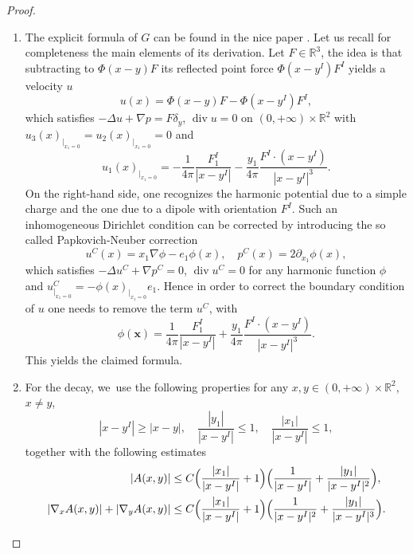 \documentclass[JEP,XML,SOM,Unicode,NoEqCountersInSection,published]{cedram}
\renewcommand{\div}{\operatorname{div}}
\theoremstyle{plain}
\theoremstyle{definition}
\newcommand{\R}{\mathbb{R}}
\begin{document}
\skpt
\begin{proof}
\begin{enumerate}
\item The explicit formula of $G$ can be found in the nice paper \cite[Formula (21)]{Gimbutas_Greengard_Veerapaneni_2015}. Let us recall for completeness the main elements of its derivation. Let $F\in \R^3$, the idea is that subtracting to $\Phi(x-y)F$ its reflected point force $\Phi(x-y^I)F^I$ yields a velocity $u$
\[
u(x)=\Phi(x-y)F-\Phi(x-y^I)F^I,
\]
which satisfies $-\Delta u +\nabla p=F \delta_y$, $\div u=0$ on $(0,+\infty)\times\R^2$ with $u_3(x)_{|_{x_1=0}}=u_2(x)_{|_{x_1=0}}=0$ and
\[
u_1(x)_{|_{x_1=0}}=- \frac{1}{4\pi}\frac{F_1^I}{|x-y^I|}-\frac{y_1}{4\pi} \frac{F^I \cdot (x-y^I)}{|x-y^I|^3}.
\]
On the right-hand side, one recognizes the harmonic potential due to a simple charge and the one due to a dipole with orientation $F^I$.
Such an inhomogeneous Dirichlet condition can be corrected by introducing the so called Papkovich-Neuber correction \cite[Def.\,2.1]{Gimbutas_Greengard_Veerapaneni_2015}
\[
u^C(x)=x_1 \nabla \phi-e_1 \phi(x), \quad p^C(x)=2\partial_{x_1}\phi(x),
\]
which satisfies $-\Delta u^C+\nabla p^C =0$, $\div u^C=0$ for any harmonic function $\phi$ and $u^C_{|_{x_1=0}}=-\phi(x)_{|_{x_1=0}}e_1$. Hence in order to correct the boundary condition of $u$ one needs to remove the term $u^C$, with
\[
\phi(\mathbf{x})=\frac{1}{4\pi}\frac{F_1^I}{|x-y^I|}+\frac{y_1}{4\pi} \frac{F^I \cdot (x-y^I)}{|x-y^I|^3}.
\]
This yields the claimed formula.
\item For the decay, we~use the following properties for any $x, y \in (0,+\infty)\times \R^2 $, $x\neq y$,
\[
|x-y^I|\geq |x-y|, \quad \frac{|y_1|}{|x-y^I|} \leq 1, \quad \frac{|x_1|}{|x-y^I|} \leq 1,
\]
together with the following estimates
\begin{align*}
|A(x,y)| &\leq C \Bigl(\frac{|x_1|}{|x-y^I|}+ 1 \Bigr) \Bigl(\frac{1}{|x-y^I|}+ \frac{|y_1|}{|x-y^I|^2} \Bigr),
\\
|\nabla_x A(x,y)|+|\nabla_y A(x,y)| &\leq C \Bigl(\frac{|x_1|}{|x-y^I|}+ 1 \Bigr) \Bigl(\frac{1}{|x-y^I|^2}+ \frac{|y_1|}{|x-y^I|^3} \Bigr).\qedhere
\end{align*}
\end{enumerate}
\end{proof}

\backmatter


\end{document}
